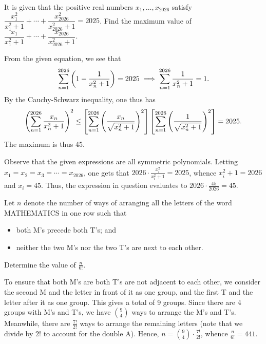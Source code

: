 \clearpage
\begin{question}[45]\label{A::2024-O-1-23}
    It is given that the positive real numbers $x_1, \ldots, x_{2026}$ satisfy $\dfrac{x_1^2}{x_1^2 + 1} + \cdots + \dfrac{x_{2026}^2}{x_{2026}^2 + 1} = 2025$. Find the maximum value of $\dfrac{x_1}{x_1^2 + 1} + \cdots + \dfrac{x_{2026}}{x_{2026}^2 + 1}$.
\end{question}
\begin{solution}
    From the given equation, we see that \[\sum_{n=1}^{2026} \left( 1 - \frac1{x_n^2 +1} \right) = 2025 \implies \sum_{n=1}^{2026} \frac1{x_n^2 + 1} = 1.\] By the Cauchy-Schwarz inequality, one thus has \[\left( \sum_{n=1}^{2026} \frac{x_n}{x_n^2 + 1} \right)^2 \leq \left[ \sum_{n=1}^{2026} \left( \frac{x_n}{\sqrt{x_n^2 + 1}} \right)^2 \right] \left[ \sum_{n=1}^{2026} \left( \frac{1}{\sqrt{x_n^2 + 1}} \right)^2 \right] = 2025.\] The maximum is thus 45.
\end{solution}
\begin{solution}
    Observe that the given expressions are all symmetric polynomials. Letting $x_1 = x_2 = x_3 = \cdots = x_{2026}$, one gets that $2026 \cdot \frac{x_i^2}{x_i^2 + 1} = 2025$, whence $x_i^2 + 1 = 2026$ and $x_i = 45$. Thus, the expression in question evaluates to $2026 \cdot \frac{45}{2026} = 45$. 
\end{solution}

\begin{question}[441]\label{A::2024-O-1-24}
    Let $n$ denote the number of ways of arranging all the letters of the word MATHEMATICS in one row such that
    \begin{itemize}
        \item both M's precede both T's; and
        \item neither the two M's nor the two T's are next to each other.
    \end{itemize}
    Determine the value of $\frac{n}{6!}$.
\end{question}
\begin{solution*}
    To ensure that both M's are both T's are not adjacent to each other, we consider the second M and the letter in front of it as one group, and the first T and the letter after it as one group. This gives a total of 9 groups. Since there are 4 groups with M's and T's, we have $\binom{9}{4}$ ways to arrange the M's and T's. Meanwhile, there are $\frac{7!}{2!}$ ways to arrange the remaining letters (note that we divide by $2!$ to account for the double A). Hence, $n = \binom{9}{4} \cdot \frac{7!}{2!}$, whence $\frac{n}{6!} = 441$.
\end{solution*}

